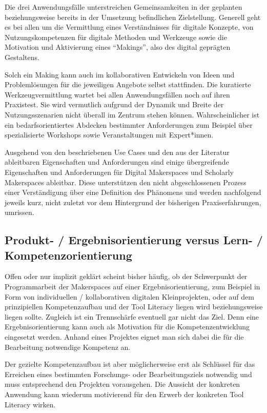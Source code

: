 \documentclass[a4paper,
fontsize=11pt,
oneside,
numbers=noperiodatend,
parskip=half-,
bibliography=totoc,
final
]{scrartcl}
\begin{document}
Die drei Anwendungsfälle unterstreichen Gemeinsamkeiten in der geplanten
beziehungsweise bereits in der Umsetzung befindlichen Zielstellung.
Generell geht es bei allen um die Vermittlung eines Verständnisses für
digitale Konzepte, von Nutzungskompetenzen für digitale Methoden und
Werkzeuge sowie die Motivation und Aktivierung eines \enquote{Makings},
also des digital geprägten Gestaltens.

Solch ein Making kann auch im kollaborativen Entwickeln von Ideen und
Problemlösungen für die jeweiligen Angebote selbst stattfinden. Die
kuratierte Werkzeugvermittlung wartet bei allen Anwendungsfällen noch
auf ihren Praxistest. Sie wird vermutlich aufgrund der Dynamik und
Breite der Nutzungsszenarien nicht überall im Zentrum stehen können.
Wahrscheinlicher ist ein bedarfsorientiertes Abdecken bestimmter
Anforderungen zum Beispiel über spezialisierte Workshops sowie
Veranstaltungen mit Expert*innen.

Ausgehend von den beschriebenen Use Cases und den aus der Literatur
ableitbaren Eigenschaften und Anforderungen sind einige übergreifende
Eigenschaften und Anforderungen für Digital Makerspaces und Scholarly
Makerspaces ableitbar. Diese unterstützen den nicht abgeschlossenen
Prozess einer Verständigung über eine Definition des Phänomens und
werden nachfolgend jeweils kurz, nicht zuletzt vor dem Hintergrund der
bisherigen Praxiserfahrungen, umrissen.

\hypertarget{produkt--ergebnisorientierung-versus-lern--kompetenzorientierung}{%
\subsection{Produkt- / Ergebnisorientierung versus Lern- /
Kompetenzorientierung}\label{produkt--ergebnisorientierung-versus-lern--kompetenzorientierung}}

Offen oder nur implizit geklärt scheint bisher häufig, ob der
Schwerpunkt der Programmarbeit der Makerspaces auf einer
Ergebnisorientierung, zum Beispiel in Form von individuellen /
kollaborativen digitalen Kleinprojekten, oder auf dem prinzipiellen
Kompetenzaufbau und der Tool Literacy liegen wird beziehungsweise liegen
sollte. Zugleich ist ein Trennschärfe eventuell gar nicht das Ziel. Denn
eine Ergebnisorientierung kann auch als Motivation für die
Kompetenzentwicklung eingesetzt werden. Anhand eines Projektes eignet
man sich dabei die für die Bearbeitung notwendige Kompetenz an.

Der gezielte Kompetenzaufbau ist aber möglicherweise erst als Schlüssel
für das Erreichen eines bestimmten Forschungs- oder Bearbeitungsziels
notwendig und muss entsprechend den Projekten vorausgehen. Die Aussicht
der konkreten Anwendung kann wiederum motivierend für den Erwerb der
konkreten Tool Literacy wirken.
\end{document}
